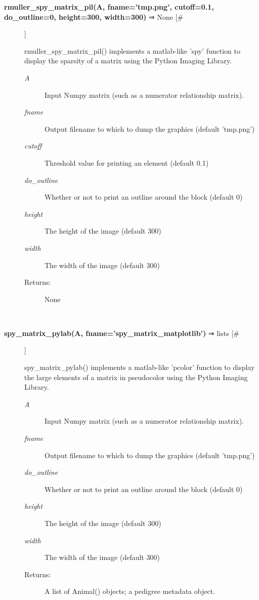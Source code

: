 \begin{description}
\item[\textbf{rmuller\_spy\_matrix\_pil(A, fname='tmp.png', cutoff=0.1, do\_outline=0, 
height=300, width=300)} ⇒ None [\#]
]
\par rmuller\_spy\_matrix\_pil() implements a matlab-like 'spy' function to display the
sparsity of a matrix using the Python Imaging Library.
\begin{description}
\item[\textit{A}
]
Input Numpy matrix (such as a numerator relationship matrix).
\item[\textit{fname}
]
Output filename to which to dump the graphics (default 'tmp.png')
\item[\textit{cutoff}
]
Threshold value for printing an element (default 0.1)
\item[\textit{do\_outline}
]
Whether or not to print an outline around the block (default 0)
\item[\textit{height}
]
The height of the image (default 300)
\item[\textit{width}
]
The width of the image (default 300)
\item[Returns:
]
None
\end{description}\\

\item[\textbf{spy\_matrix\_pylab(A, fname='spy\_matrix\_matplotlib')} ⇒ lists [\#]
]
\par spy\_matrix\_pylab() implements a matlab-like 'pcolor' function to
display the large elements of a matrix in pseudocolor using the Python Imaging
Library.
\begin{description}
\item[\textit{A}
]
Input Numpy matrix (such as a numerator relationship matrix).
\item[\textit{fname}
]
Output filename to which to dump the graphics (default 'tmp.png')
\item[\textit{do\_outline}
]
Whether or not to print an outline around the block (default 0)
\item[\textit{height}
]
The height of the image (default 300)
\item[\textit{width}
]
The width of the image (default 300)
\item[Returns:
]
A list of Animal() objects; a pedigree metadata object.
\end{description}\\

\end{description}
